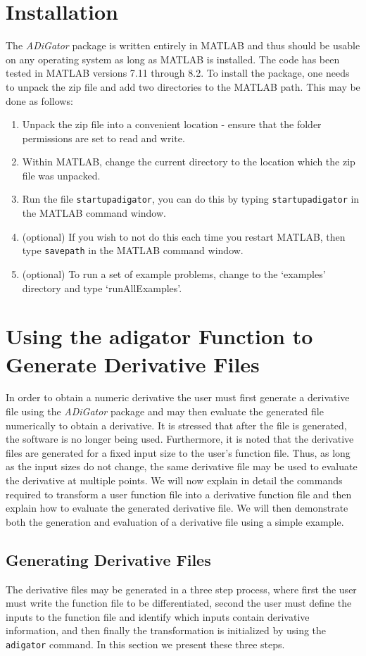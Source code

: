 \documentclass[10pt,pdftex]{article}
\begin{document}
\section{Installation}
The \emph{ADiGator} package is written entirely in MATLAB and thus should be usable on any operating system as long as MATLAB is installed. The code has been tested in MATLAB versions 7.11 through 8.2. To install the package, one needs to unpack the zip file and add two directories to the MATLAB path. This may be done as follows:
\begin{enumerate}
\item Unpack the zip file into a convenient location - ensure that the folder permissions are set to read and write.
\item Within MATLAB, change the current directory to the location which the zip file was unpacked.
\item Run the file \texttt{startupadigator}, you can do this by typing \texttt{startupadigator} in the MATLAB command window.
\item (optional) If you wish to not do this each time you restart MATLAB, then type \texttt{savepath} in the MATLAB command window.
\item (optional) To run a set of example problems, change to the `examples' directory and type `runAllExamples'.
\end{enumerate}
\section{Using the {adigator} Function to Generate Derivative Files}\label{Sec:Using}
In order to obtain a numeric derivative the user must first generate a derivative file using the \emph{ADiGator} package and may then evaluate the generated file numerically to obtain a derivative. It is stressed that after the file is generated, the software is no longer being used. Furthermore, it is noted that the derivative files are generated for a fixed input size to the user's function file. Thus, as long as the input sizes do not change, the same derivative file may be used to evaluate the derivative at multiple points. We will now explain in detail the commands required to transform a user function file into a derivative function file and then explain how to evaluate the generated derivative file. We will then demonstrate both the generation and evaluation of a derivative file using a simple example.
\subsection{Generating Derivative Files}
The derivative files may be generated in a three step process, where first the user must write the function file to be differentiated, second the user must define the inputs to the function file and identify which inputs contain derivative information, and then finally the transformation is initialized by using the \texttt{adigator} command. In this section we present these three steps.
\end{document}
